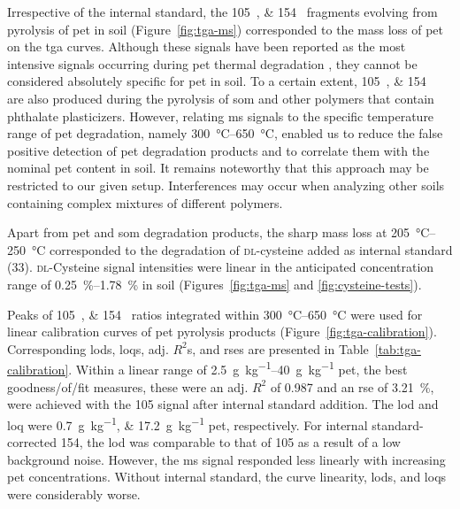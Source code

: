 Irrespective of the internal standard, the \SIlist{105;154}{\mz} fragments evolving from pyrolysis of \ac{pet} in soil (Figure~\ref{fig:tga-ms}) corresponded to the mass loss of \ac{pet} on the \ac{tga} curves.
Although these signals have been reported as the most intensive signals occurring during \ac{pet} thermal degradation \citep{DumichenFast2017,DimitrovAnalysis2013}, they cannot be considered absolutely specific for \ac{pet} in soil.
To a certain extent, \SIlist{105;154}{\mz} are also produced during the pyrolysis of \ac{som} \citep{SchultenThermal1999} and other polymers that contain phthalate plasticizers. However, relating \ac{ms} signals to the specific temperature range of \ac{pet} degradation, namely \SIrange{300}{650}{\degreeCelsius}, enabled us to reduce the false positive detection of \ac{pet} degradation products and to correlate them with the nominal \ac{pet} content in soil.
It remains noteworthy that this approach may be restricted to our given setup. Interferences may occur when analyzing other soils containing complex mixtures of different polymers.

Apart from \ac{pet} and \ac{som} degradation products, the sharp mass loss at \SIrange{205}{250}{\degreeCelsius} corresponded to the degradation of \textsc{dl}-cysteine added as internal standard (\SI{33}{\mz}). \textsc{dl}-Cysteine signal intensities were linear in the anticipated concentration range of \SIrange{0.25}{1.78}{\percent} in soil (Figures~\ref{fig:tga-ms} and \ref{fig:cysteine-tests}).

Peaks of \SIlist{105;154}{\mz} ratios integrated within \SIrange{300}{650}{\degreeCelsius} were used for linear calibration curves of \ac{pet} pyrolysis products (Figure~\ref{fig:tga-calibration}). Corresponding \acp{lod}, \acp{loq}, adj. $R^2$s, and \acp{rse} are presented in Table~\ref{tab:tga-calibration}.
Within a linear range of \SIrange{2.5}{40}{\gram\per\kilo\gram} \ac{pet}, the best goodness\-/of\-/fit measures, these were an adj. $R^2$ of \num{0.987} and an \ac{rse} of \SI{3.21}{\percent}, were achieved with the \SI{105}{\mz} signal after internal standard addition.
The \ac{lod} and \ac{loq} were \SIlist{0.7;17.2}{\gram\per\kilo\gram} \ac{pet}, respectively. For internal standard-corrected \SI{154}{\mz}, the \ac{lod} was comparable to that of \SI{105}{\mz} as a result of a low background noise.
However, the \ac{ms} signal responded less linearly with increasing \ac{pet} concentrations. Without internal standard, the curve linearity, \acp{lod}, and \acp{loq} were considerably worse.

